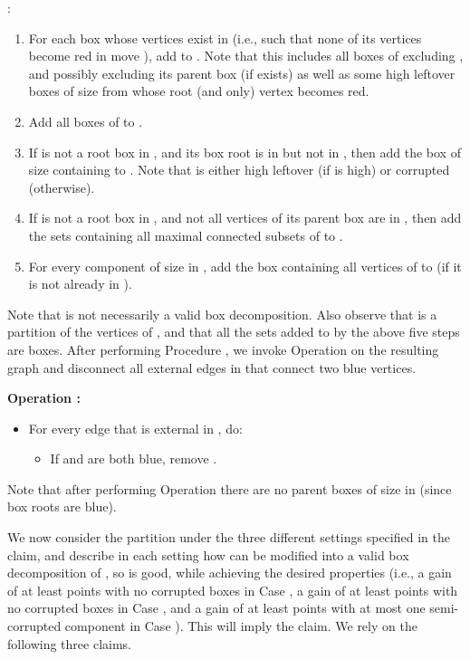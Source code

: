 \documentclass[11pt]{article}
\def\dnsitem{\vspace{-7pt}\item}
\theoremstyle{definition}
\begin{document}
\smallskip
\par{}:
\begin{enumerate}
	\dnsitem For each box  whose vertices exist in  (i.e., such that none of its vertices become red in move ),
	add  to .
	Note that this includes all boxes of  excluding , and possibly excluding its parent box  (if exists) 
	as well as some high leftover boxes of size  from  whose root (and only) vertex becomes red.
	\dnsitem Add all boxes of  to .

	\dnsitem If  is not a root box in , and its box root  is in  but not in ,
	then add the box  of size  containing  to .
	Note that  is either high leftover (if  is high) or corrupted (otherwise).

	\dnsitem If  is not a root box in , and not all vertices of its parent box  are in , 
	then add the sets  containing all maximal connected subsets of  to .
	\dnsitem For every component  of size  in , 
	add the box  containing all vertices of  to  (if it is not already in ). 
\end{enumerate}
Note that  is not necessarily a valid box decomposition.
Also observe that  is a partition of the vertices of , and that all the sets added to  by the above five steps are boxes.
After performing Procedure , we invoke Operation  on the resulting graph  and disconnect all external edges in  that connect two blue vertices.
\smallskip
\par\noindent
{\bf Operation :}
\begin{itemize}
\dnsitem[] For every edge  that is external in , do:
	\begin{itemize}
		\dnsitem[] If  and  are both blue, remove .
	\end{itemize}
\end{itemize}
\bigskip
Note that after performing Operation  there are no parent boxes of size  in  (since box roots are blue).

We now consider the partition  under the three different settings specified in the claim, and describe in each setting how  can be modified into a valid box decomposition of , so  is good, while achieving the desired properties (i.e., a gain of at least  points with no corrupted boxes in Case , a gain of at least  points with no corrupted boxes in Case , and a gain of at least  points with at most one semi-corrupted component in Case ). This will imply the claim.
We rely on the following three claims.
\end{document}
